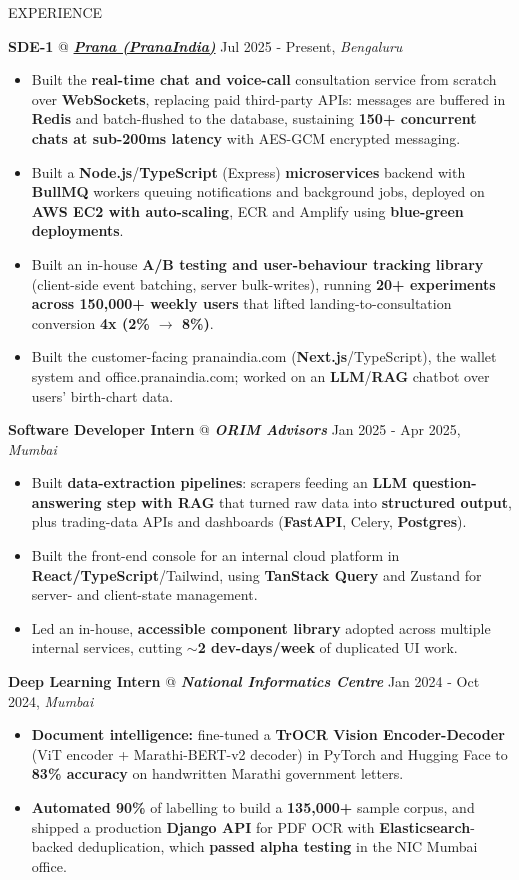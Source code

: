 \documentclass{resume} %
\makeatletter
\newcommand{\experience}[5]{
    \textbf{#1} @ \textit{\textbf{#2}} \hfill #3, \textit{#4}
    \vspace{-7pt}
    \begin{itemize}[leftmargin=*]
        \itemsep -7pt {}
        #5
    \end{itemize}
    \vspace{-4pt}
}
\makeatother
\begin{document}

\begin{rSection}{EXPERIENCE}

\experience{SDE-1}{\href{https://pranaindia.com}{Prana (PranaIndia)}}{Jul 2025 - Present}{Bengaluru}{
    \item Built the \textbf{real-time chat and voice-call} consultation service from scratch over \textbf{WebSockets}, replacing paid third-party APIs: messages are buffered in \textbf{Redis} and batch-flushed to the database, sustaining \textbf{150+ concurrent chats at sub-200ms latency} with AES-GCM encrypted messaging.
    \item Built a \textbf{Node.js}/\textbf{TypeScript} (Express) \textbf{microservices} backend with \textbf{BullMQ} workers queuing notifications and background jobs, deployed on \textbf{AWS EC2 with auto-scaling}, ECR and Amplify using \textbf{blue-green deployments}.
    \item Built an in-house \textbf{A/B testing and user-behaviour tracking library} (client-side event batching, server bulk-writes), running \textbf{20+ experiments across 150,000+ weekly users} that lifted landing-to-consultation conversion \textbf{4x (2\% $\to$ 8\%)}.
    \item Built the customer-facing pranaindia.com (\textbf{Next.js}/TypeScript), the wallet system and office.pranaindia.com; worked on an \textbf{LLM}/\textbf{RAG} chatbot over users' birth-chart data.
}

\experience{Software Developer Intern}{ORIM Advisors}{Jan 2025 - Apr 2025}{Mumbai}{
    \item Built \textbf{data-extraction pipelines}: scrapers feeding an \textbf{LLM question-answering step with RAG} that turned raw data into \textbf{structured output}, plus trading-data APIs and dashboards (\textbf{FastAPI}, Celery, \textbf{Postgres}).
    \item Built the front-end console for an internal cloud platform in \textbf{React/TypeScript}/Tailwind, using \textbf{TanStack Query} and Zustand for server- and client-state management.
    \item Led an in-house, \textbf{accessible component library} adopted across multiple internal services, cutting \textbf{$\sim$2 dev-days/week} of duplicated UI work.
}

\experience{Deep Learning Intern}{National Informatics Centre}{Jan 2024 - Oct 2024}{Mumbai}{
    \item \textbf{Document intelligence:} fine-tuned a \textbf{TrOCR Vision Encoder-Decoder} (ViT encoder + Marathi-BERT-v2 decoder) in PyTorch and Hugging Face to \textbf{83\% accuracy} on handwritten Marathi government letters.
    \item \textbf{Automated 90\%} of labelling to build a \textbf{135,000+} sample corpus, and shipped a production \textbf{Django API} for PDF OCR with \textbf{Elasticsearch}-backed deduplication, which \textbf{passed alpha testing} in the NIC Mumbai office.
}


\end{rSection}
\end{document}
